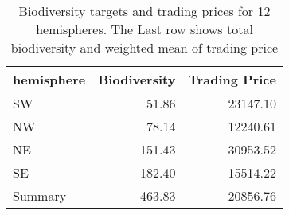 \begin{table}

\caption{\label{tab:pro-trading-prices}Biodiversity targets and trading prices for 12 hemispheres. The Last row shows total biodiversity and weighted mean of trading price}
\centering
\begin{tabular}[t]{l|r|r}
\hline
hemisphere & Biodiversity & Trading Price\\
\hline
SW & 51.86 & 23147.10\\
\hline
NW & 78.14 & 12240.61\\
\hline
NE & 151.43 & 30953.52\\
\hline
SE & 182.40 & 15514.22\\
\hline
Summary & 463.83 & 20856.76\\
\hline
\end{tabular}
\end{table}